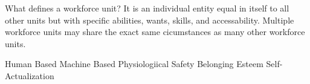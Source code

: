 What defines a workforce unit? It is an individual entity equal in itself to all other units but with specific abilities, wants, skills, and accessability. Multiple workforce units may share the exact same cicumstances as many other workforce units.

Human Based		Machine Based
Physiologiical
Safety
Belonging
Esteem
Self-Actualization 






 










